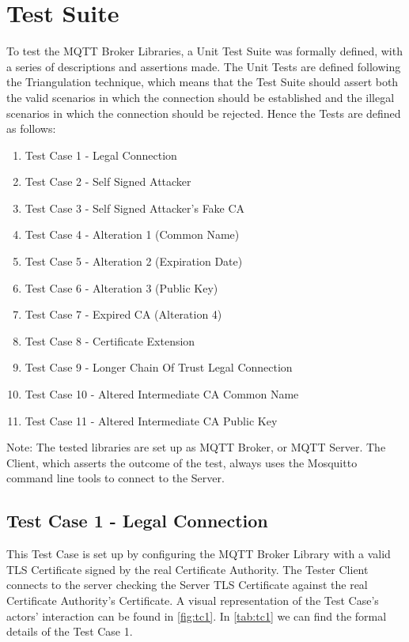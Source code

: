 \documentclass[binding=0.6cm,noexaminfo]{sapthesis}
\begin{document}
\chapter{Test Suite}\label{ch:test_suite}
To test the MQTT Broker Libraries, a Unit Test Suite was formally defined, with a series of descriptions and assertions made. The Unit Tests are defined following the Triangulation technique, which means that the Test Suite should assert both the valid scenarios in which the connection should be established and the illegal scenarios in which the connection should be rejected. Hence the Tests are defined as follows:
\begin{enumerate}
	\item Test Case 1 - Legal Connection
	\item Test Case 2 - Self Signed Attacker
	\item Test Case 3 - Self Signed Attacker's Fake CA
	\item Test Case 4 - Alteration 1 (Common Name)
	\item Test Case 5 - Alteration 2 (Expiration Date)
	\item Test Case 6 - Alteration 3 (Public Key)
	\item Test Case 7 - Expired CA (Alteration 4)
	\item Test Case 8 - Certificate Extension
	\item Test Case 9 - Longer Chain Of Trust Legal Connection
	\item Test Case 10 - Altered Intermediate CA Common Name
	\item Test Case 11 - Altered Intermediate CA Public Key
\end{enumerate}
Note: The tested libraries are set up as MQTT Broker, or MQTT Server. The Client, which asserts the outcome of the test, always uses the Mosquitto command line tools to connect to the Server.

\section{Test Case 1 - Legal Connection}
This Test Case is set up by configuring the MQTT Broker Library with a valid TLS Certificate signed by the real Certificate Authority. The Tester Client connects to the server checking the Server TLS Certificate against the real Certificate Authority’s Certificate. A visual representation of the Test Case's actors' interaction can be found in \autoref{fig:tc1}. In \autoref{tab:tc1} we can find the formal details of the Test Case 1.
\end{document}
